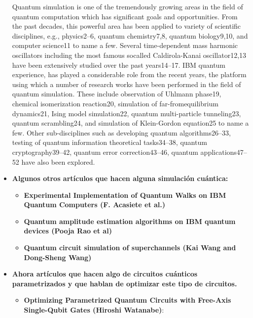 \documentclass[10pt,letterpaper]{article} %
\begin{document}
\begin{itemize}
Quantum simulation is one of the tremendously growing areas in the field of quantum computation which
has significant goals and opportunities. From the
past decades, this powerful area has been applied to
variety of scientific disciplines, e.g., physics2–6, quantum chemistry7,8, quantum biology9,10, and computer
science11 to name a few. Several time-dependent mass
harmonic oscillators including the most famous socalled Caldirola-Kanai oscillator12,13 have been extensively studied over the past years14–17. IBM quantum
experience, has played a considerable role from the recent years, the platform using which a number of research
works have been performed in the field of quantum simulation. These include observation of Uhlmann phase19, chemical isomerization reaction20, simulation of far-fromequilibrium dynamics21, Ising model simulation22, quantum multi-particle tunneling23, quantum scrambling24, and simulation of Klein-Gordon equation25 to name a
few. Other sub-disciplines such as developing quantum
algorithms26–33, testing of quantum information theoretical tasks34–38, quantum cryptography39–42, quantum error correction43–46, quantum applications47–52 have also
been explored.

\item \textbf{Algunos otros art\'iculos que hacen alguna simulaci\'on cu\'antica:}

\begin{itemize}
\item \textbf{Experimental Implementation of Quantum Walks on
IBM Quantum Computers (F. Acasiete et al.)} 


\item  \textbf{Quantum amplitude estimation algorithms on IBM quantum
devices (Pooja Rao et al)}



\item \textbf{Quantum circuit simulation of superchannels (Kai Wang and Dong-Sheng Wang)} \\
\end{itemize}


\item \textbf{Ahora art\'iculos que hacen algo de circuitos cu\'anticos parametrizados y que hablan de optimizar este tipo de circuitos.}


\begin{itemize}
\item  \textbf{Optimizing Parametrized Quantum Circuits
with Free-Axis Single-Qubit Gates (Hiroshi Watanabe)}:\\


\end{itemize}
\end{itemize}
\end{document}
